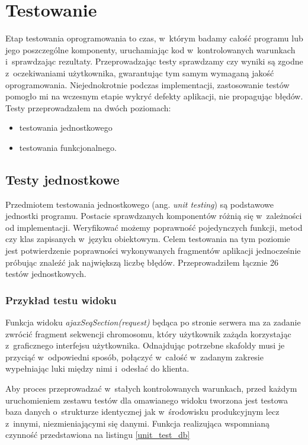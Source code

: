 \documentclass[a4paper,12pt,oneside]{mwrep}  %
\begin{document}
\section{Testowanie}
Etap testowania oprogramowania to czas, w~którym badamy całość programu lub jego poszczególne komponenty, uruchamiając kod w~kontrolowanych warunkach i~sprawdzając rezultaty. Przeprowadzając testy sprawdzamy czy wyniki są zgodne z~oczekiwaniami użytkownika, gwarantując tym samym wymaganą jakość oprogramowania. Niejednokrotnie podczas implementacji, zastosowanie testów pomogło mi na wczesnym etapie wykryć defekty aplikacji, nie propagując błędów. Testy przeprowadzałem na dwóch poziomach: 
\begin{itemize}
\item testowania jednostkowego
\item testowania funkcjonalnego.
\end{itemize}

\subsection{Testy jednostkowe}
Przedmiotem testowania jednostkowego (ang. \emph{unit testing}) są podstawowe jednostki programu. Postacie sprawdzanych komponentów różnią się w~zależności od implementacji. Weryfikować możemy poprawność pojedynczych funkcji, metod czy klas zapisanych w~języku obiektowym. Celem testowania na tym poziomie jest potwierdzenie poprawności wykonywanych fragmentów aplikacji jednocześnie próbując znaleźć jak największą liczbę błędów. Przeprowadziłem łącznie 26 testów jednostkowych.

\subsubsection{Przykład testu widoku}
Funkcja widoku \emph{ajaxSeqSection(request)} będąca po stronie serwera ma za zadanie zwrócić fragment sekwencji chromosomu, który użytkownik zażąda korzystając z~graficznego interfejsu użytkownika. Odnajdując potrzebne skafoldy musi je przyciąć w~odpowiedni sposób, połączyć w~całość w~zadanym zakresie wypełniając luki między nimi i~odesłać do klienta.

Aby proces przeprowadzać w~stałych kontrolowanych warunkach, przed każdym uruchomieniem zestawu testów dla omawianego widoku tworzona jest testowa baza danych o~strukturze identycznej jak w~środowisku produkcyjnym lecz z~innymi, niezmieniającymi się danymi. Funkcja realizująca wspomnianą czynność przedstawiona na listingu \ref{unit_test_db}
\end{document}
